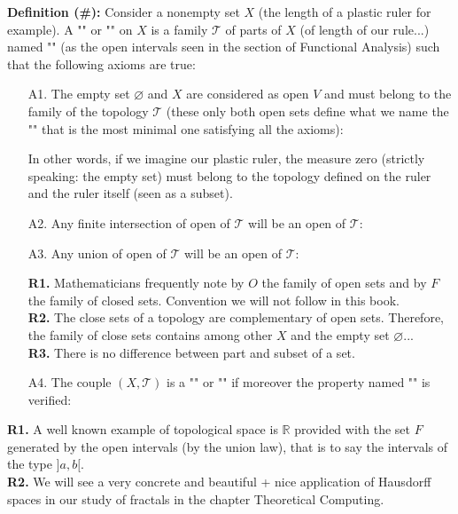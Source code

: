 	\textbf{Definition (\#\mydef):} Consider a nonempty set $X$ (the length of a plastic ruler for example). A "" or "" on $X$ is a family $\mathcal{T}$ of parts of $X$ (of length of our rule...) named ""  (as the open intervals seen in the section  of Functional Analysis) such that the following axioms are true:
	\begin{enumerate}
		\item[A1.] The empty set $\varnothing$ and $X$ are considered as open $V$ and must belong to the family of the topology $\mathcal{T}$ (these only both open sets define what we name the "" that is the most minimal one satisfying all the axioms):
		
		In other words, if we imagine our plastic ruler, the measure zero (strictly speaking: the empty set) must belong to the topology defined on the ruler and the ruler itself (seen as a subset).
		
		\item[A2.] Any finite intersection of open of $\mathcal{T}$ will be an open of $\mathcal{T}$:
		
		
		\item[A3.] Any union of open of $\mathcal{T}$ will be an open of $\mathcal{T}$:
		
		\begin{tcolorbox}[title=Remarks,colframe=black,arc=10pt]
		\textbf{R1.} Mathematicians frequently note by $O$ the family of open sets and by $F$ the family of closed sets. Convention we will not follow in this book.\\

		\textbf{R2.} The close sets of a topology are complementary of open sets. Therefore, the family of  close sets contains among other $X$ and the empty set $\varnothing$...\\
	
		\textbf{R3.} There is no difference between part and subset of a set.
		\end{tcolorbox}
		
		\item[A4.] The couple $(X,\mathcal{T})$ is a "" or "" if moreover the property named "" is verified:
				
	\end{enumerate}
	\begin{tcolorbox}[title=Remarks,colframe=black,arc=10pt]
		\textbf{R1.} A well known example of topological space is $\mathbb{R}$ provided with the set $F$ generated by the open intervals (by the union law), that is to say the intervals of the type $] a, b [$.\\
		
		\textbf{R2.} We will see a very concrete and beautiful + nice application of Hausdorff spaces in our study of fractals in the chapter Theoretical Computing.
	\end{tcolorbox}
	
